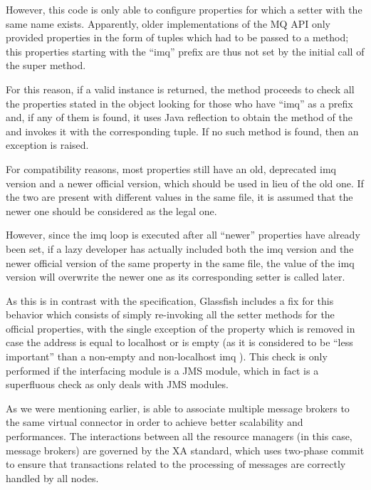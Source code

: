 However, this code is only able to configure properties for which a setter with the same name exists. Apparently, older implementations of the MQ API only provided properties in the form of  tuples which had to be passed to a  method; this properties starting with the “imq” prefix are thus not set by the initial call of the super  method.

For this reason, if a valid  instance is returned, the method proceeds to check all the properties stated in the  object looking for those who have “imq” as a prefix and, if any of them is found, it uses Java reflection to obtain the  method of the  and invokes it with the corresponding  tuple. If no such method is found, then an exception is raised.

For compatibility reasons, most properties still have an old, deprecated imq version and a newer official version, which should be used in lieu of the old one. If the two are present with different values in the same file, it is assumed that the newer one should be considered as the legal one.

However, since the imq loop is executed after all “newer” properties have already been set, if a lazy developer has actually included both the imq version and the newer official version of the same property in the same file, the value of the imq version will overwrite the newer one as its corresponding setter is called later.

As this is in contrast with the specification, Glassfish includes a fix for this behavior which consists of simply re-invoking all the setter methods for the official properties, with the single exception of the  property which is removed in case the address is equal to localhost or is empty (as it is considered to be “less important” than a non-empty and non-localhost imq ). This check is only performed if the interfacing module is a JMS module, which in fact is a superfluous check as  only deals with JMS modules. 

As we were mentioning earlier,  is able to associate multiple message brokers to the same virtual connector in order to achieve better scalability and performances. The interactions between all the resource managers (in this case, message brokers) are governed by the XA standard, which uses two-phase commit to ensure that transactions related to the processing of messages are correctly handled by all nodes.

